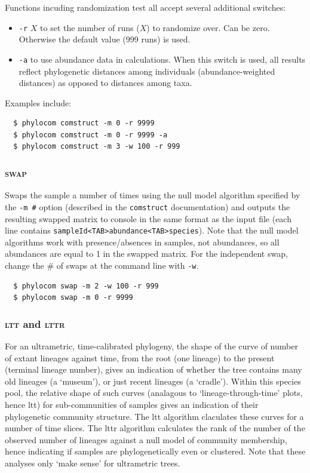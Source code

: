 \documentclass[12pt,letterpaper]{article}
\begin{document}
Functions incuding randomization test all accept several additional
switches:
\begin{itemize}
  \item \verb|-r| $X$ to set the number of runs ($X$) to randomize over. Can
be zero. Otherwise the default value (999 runs) is used.
  \item  \verb|-a| to use abundance data in calculations. When this switch is
used, all results reflect phylogenetic distances among individuals
(abundance-weighted distances) as opposed to distances among taxa.
\end{itemize}

Examples include:
\begin{verbatim}
  $ phylocom comstruct -m 0 -r 9999
  $ phylocom comstruct -m 0 -r 9999 -a
  $ phylocom comstruct -m 3 -w 100 -r 999
\end{verbatim}

\subsubsection{\scshape swap}

Swaps the sample a number of times using the null model algorithm
specified by the \verb|-m #| option (described in the \verb|comstruct|
documentation) and outputs the resulting swapped matrix to console in
the same format as the input file (each line
contains \verb|sampleId<TAB>abundance<TAB>species|). Note that the
null model algorithms work with presence/absences in samples, not
abundances, so all abundances are equal to 1 in the swapped
matrix. For the independent swap, change the \# of swaps at the command
line with \verb|-w|.

\begin{verbatim}
  $ phylocom swap -m 2 -w 100 -r 999
  $ phylocom swap -m 0 -r 9999
\end{verbatim}

\subsubsection{{\scshape ltt} and {\scshape lttr}}

For an ultrametric, time-calibrated phylogeny, the shape of the curve
of number of extant lineages against time, from the root (one lineage)
to the present (terminal lineage number), gives an indication of
whether the tree contains many old lineages (a `museum'), or just
recent lineages (a `cradle').  Within this species pool, the relative
shape of such curves (analagous to `lineage-through-time' plots, hence
{\sc ltt}) for sub-communities of samples gives an indication of their
phylogenetic community structure.  The {\sc ltt} algorithm claculates
these curves for a number of time slices.   The {\sc lttr} algorithm
calculates the rank of the number of the observed number of lineages
against a null model of community membership, hence indicating if
samples are phylogenetically even or clustered.  Note that these
analyses only `make sense' for ultrametric trees.
\end{document}
